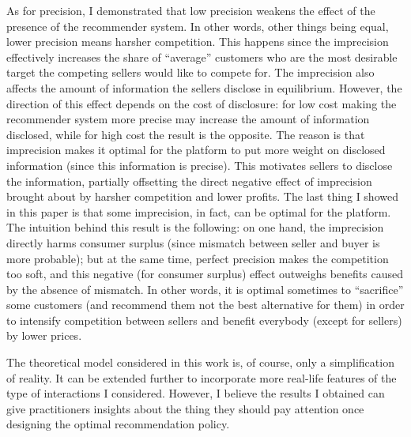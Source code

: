 \documentclass[a4paper]{article}
\begin{document}
	
As for precision, I demonstrated that low precision weakens the effect of the presence of the recommender system. In other words, other things being equal, lower precision means harsher competition. This happens since the imprecision effectively increases the share of ``average'' customers who are the most desirable target the competing sellers would like to compete for. The imprecision also affects the amount of information the sellers disclose in equilibrium. However, the direction of this effect depends on the cost of disclosure: for low cost making the recommender system more precise may increase the amount of information disclosed, while for high cost the result is the opposite. The reason is that imprecision makes it optimal for the platform to put more weight on disclosed information (since this information is precise). This motivates sellers to disclose the information, partially offsetting the direct negative effect of imprecision brought about by harsher competition and lower profits. The last thing I showed in this paper is that some imprecision, in fact, can be optimal for the platform. The intuition behind this result is the following: on one hand, the imprecision directly harms consumer surplus (since mismatch between seller and buyer is more probable); but at the same time, perfect precision makes the competition too soft, and this negative (for consumer surplus) effect outweighs benefits caused by the absence of mismatch. In other words, it is optimal sometimes to ``sacrifice'' some customers (and recommend them not the best alternative for them) in order to intensify competition between sellers and benefit everybody (except for sellers) by lower prices.
	
	
	
	The theoretical model considered in this work is, of course, only a simplification of reality. It can be extended further to incorporate more real-life features of the type of interactions I considered. However, I believe the results I obtained can give practitioners insights about the thing they should pay attention once designing the optimal recommendation policy.
	\newpage
\appendix
\end{document}
